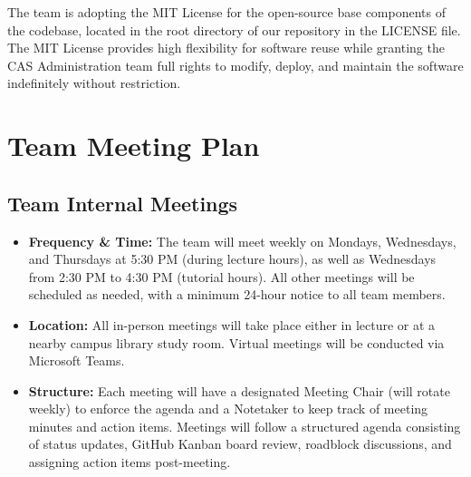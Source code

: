 \documentclass{article}
\begin{document}

The team is adopting the MIT License for the open-source base components of the codebase, located 
in the root directory of our repository in the LICENSE file. The MIT License provides high 
flexibility for software reuse while granting the CAS Administration team full rights to modify, 
deploy, and maintain the software indefinitely without restriction.


\section{Team Meeting Plan}

\subsection{Team Internal Meetings}

\begin{itemize}
    \item \textbf{Frequency \& Time:} The team will meet weekly on Mondays, Wednesdays, and 
    Thursdays at 5:30 PM (during lecture hours), as well as Wednesdays from 2:30 PM to 4:30 PM (tutorial hours). 
    All other meetings will be scheduled as needed, with a minimum 24-hour notice to all team members.
    \item \textbf{Location:} All in-person meetings will take place either in lecture or at a nearby 
    campus library study room. Virtual meetings will be conducted via Microsoft Teams.
    \item \textbf{Structure:} Each meeting will have a designated Meeting Chair (will rotate weekly) to enforce the agenda 
    and a Notetaker to keep track of meeting minutes and action items. Meetings will follow a 
    structured agenda consisting of status updates, GitHub Kanban board review, roadblock discussions, 
    and assigning action items post-meeting.
\end{itemize}
\end{document}
